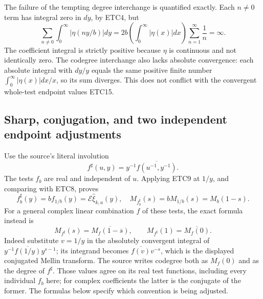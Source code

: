 The failure of the tempting degree interchange is quantified exactly.
Each $n\ne0$ term has integral zero in $dy$, by ETC4, but
\begin{equation}\tag{ETC16}
 \sum_{n\ne0}\int_0^\infty|\eta(ny/b)|dy
 =2b\left(\int_0^\infty|\eta(x)|dx\right)
                         \sum_{n=1}^\infty\frac1n=\infty.
\end{equation}
The coefficient integral is strictly positive because $\eta$ is
continuous and not identically zero. The codegree interchange also
lacks absolute convergence: each absolute integral with $dy/y$
equals the same positive finite number
$\int_0^\infty|\eta(x)|dx/x$, so its sum diverges. This does not
conflict with the convergent whole-test endpoint values ETC15.

\subsection{Sharp, conjugation, and two independent endpoint adjustments}

Use the source's literal involution
\begin{equation}\tag{ETC17}
 f^\sharp(u,y)=y^{-1}\overline{f(u^{-1},y^{-1})}.
\end{equation}
The tests $f_b$ are real and independent of $u$. Applying ETC9 at
$1/y$, and comparing with ETC8, proves
\begin{equation}\tag{ETC18}
 f_b^\sharp(y)=b f_{1/b}(y)
     =\mathcal E\widehat\xi_{k,a}(y),\quad
 M_{f_b^\sharp}(s)=bM_{1/b}(s)=M_b(1-s).
\end{equation}
For a general complex linear combination $f$ of these tests,
the exact formula instead is
\begin{equation}\tag{ETC19}
 M_{f^\sharp}(s)=\overline{M_f(1-\overline s)},\qquad
 M_{f^\sharp}(1)=\overline{M_f(0)}.
\end{equation}
Indeed substitute $v=1/y$ in the absolutely convergent integral
of $y^{-1}\overline{f(1/y)}y^{s-1}$; its integrand becomes
$\overline{f(v)}v^{-s}$, which is the displayed conjugated
Mellin transform. The source writes codegree both as $M_f(0)$
and as the degree of $f^\sharp$. Those values agree on its real
test functions, including every individual $f_b$ here; for complex
coefficients the latter is the conjugate of the former. The formulas
below specify which convention is being adjusted.

